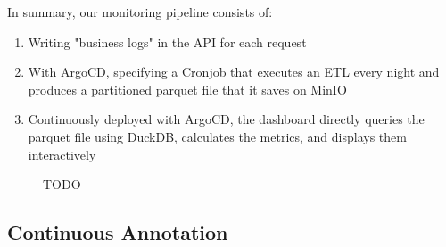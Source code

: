 In summary, our monitoring pipeline consists of:

\begin{enumerate}
    \item Writing "business logs" in the API for each request
    \item With ArgoCD, specifying a Cronjob that executes an ETL every night and produces a partitioned parquet file that it saves on MinIO
    \item Continuously deployed with ArgoCD, the dashboard directly queries the parquet file using DuckDB, calculates the metrics, and displays them interactively
\end{enumerate}


\begin{figure}[htbp]
    \centering
    \caption{TODO}
    \label{fig:api-monitoring}
\end{figure}


\subsection{Continuous Annotation}

